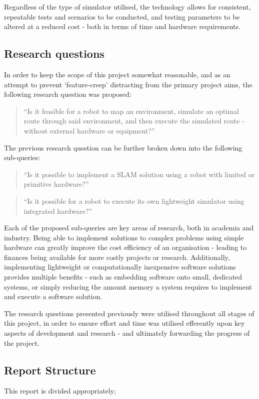 Regardless of the type of simulator utilised, the technology allows for
consistent, repeatable tests and scenarios to be conducted, and testing
parameters to be altered at a reduced cost - both in terms of time and
hardware requirements.


\subsection{Research questions} \label{sec_res_q}
In order to keep the scope of this project somewhat reasonable, and as an
attempt to prevent `feature-creep' distracting from the primary project aims,
the following research question was proposed:
\begin{quote}
    ``Is it feasible for a robot to map an environment, simulate an optimal
    route through said environment, and then execute the simulated route -
    without external hardware or equipment?''
\end{quote}

The previous research question can be further broken down into the following
sub-queries:

\begin{quote}
    ``Is it possible to implement a SLAM solution using a robot with limited or
    primitive hardware?''
\end{quote}

\begin{quote}
    ``Is it possible for a robot to execute its own lightweight simulator using
    integrated hardware?''
\end{quote}

Each of the proposed sub-queries are key areas of research, both in academia
and industry.
Being able to implement solutions to complex problems using simple hardware
can greatly improve the cost efficiency of an organisation - leading to
finances being available for more costly projects or research. 
Additionally, implementing lightweight or computationally inexpensive software
solutions provides multiple benefits - such as embedding software onto small,
dedicated systems, or simply reducing the amount memory a system requires to
implement and execute a software solution. 

The research questions presented previously were utilised throughout all
stages of this project, in order to ensure effort and time was utilised
efferently upon key aspects of development and research - and ultimately
forwarding the progress of the project.

\subsection{Report Structure}
This report is divided appropriately;

